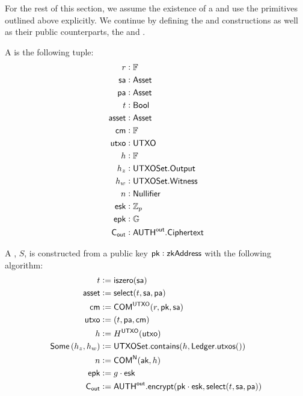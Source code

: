 For the rest of this section, we assume the existence of a \TransferConfiguration{} and use the primitives outlined above explicitly. We continue by defining the \Sender{} and \Receiver{} constructions as well as their public counterparts, the \SenderPost{} and \ReceiverPost{}.

\begin{definition}
    A \Sender{} is the following tuple:
    \begin{align*}
        r      &: {\mathbb{F}} \\
        {\textsf{sa}}    &: {\textsf{Asset}} \\
        {\textsf{pa}}    &: {\textsf{Asset}} \\
        t      &: {\textsf{Bool}} \\
        {\textsf{asset}} &: {\textsf{Asset}} \\
        {\textsf{cm}}    &: {\mathbb{F}} \\
        {\textsf{utxo}}  &: {\textsf{UTXO}} \\
        h      &: {\mathbb{F}} \\
        h_z    &: {\textsf{UTXOSet}}.{\textsf{Output}} \\
        h_w    &: {\textsf{UTXOSet}}.{\textsf{Witness}} \\
        n      &: {\textsf{Nullifier}} \\
        {\textsf{esk}}   &: {\mathbb{Z}}_p \\
        {\textsf{epk}}   &: {\mathbb{G}} \\
        {\textsf{C}_\textsf{out}}  &: {{\textsf{AUTH}}^\textsf{out}}.{\textsf{Ciphertext}}
    \end{align*}

    A \Sender{}, $S$, is constructed from a public key ${\textsf{pk}} : {\textsf{zkAddress}}$ with the following algorithm:
    \begin{align*}
        t      &:= {\textsf{iszero}}({\textsf{sa}}) \\
        {\textsf{asset}} &:= {\textsf{select}}(t, {\textsf{sa}}, {\textsf{pa}}) \\
        {\textsf{cm}}    &:= {\textsf{COM}}^{{\textsf{UTXO}}}(r, {\textsf{pk}}, {\textsf{sa}}) \\
        {\textsf{utxo}}  &:= (t, {\textsf{pa}}, {\textsf{cm}}) \\
        h      &:= H^{{\textsf{UTXO}}}({\textsf{utxo}}) \\
        {\textsf{Some}}\left(h_z, h_w\right) &:= {\textsf{UTXOSet}}.{\textsf{contains}}(h, {\textsf{Ledger}}.{\textsf{utxos}}()) \\
        n      &:= {\textsf{COM}}^{\textsf{N}}({\textsf{ak}}, h) \\
        {\textsf{epk}}   &:= g \cdot {\textsf{esk}} \\
        {\textsf{C}_\textsf{out}}  &:= {{\textsf{AUTH}}^\textsf{out}}.{\textsf{encrypt}}({\textsf{pk}} \cdot {\textsf{esk}}, {\textsf{select}}(t, {\textsf{sa}}, {\textsf{pa}}))
    \end{align*}
\end{definition}

